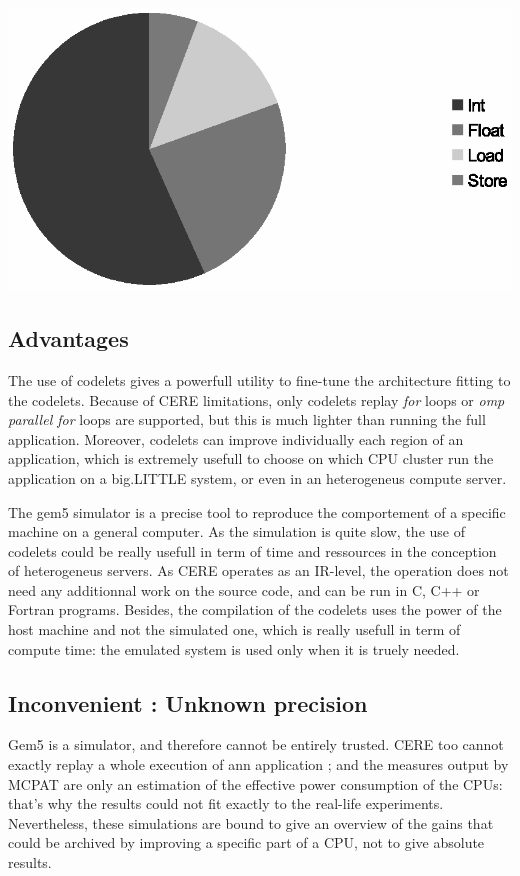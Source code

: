 \documentclass{article}
\newenvironment{Figure}
  {\par\medskip\noindent\center\minipage{0.9\linewidth}}
  {\endminipage\par\bigskip\medskip}
\begin{document}
\begin{multicols}{2}
\begin{Figure}
\centering
\includegraphics[width=\linewidth]{Blackscholes_instr.eps}
\end{Figure}

\subsection{Advantages}
The use of codelets gives a powerfull utility to fine-tune the architecture fitting to the codelets. Because of CERE limitations, only codelets replay \textit{for} loops or \textit{omp parallel for} loops are supported, but this is much lighter than running the full application. Moreover, codelets can improve individually each region of an application, which is extremely usefull to choose on which CPU cluster run the application on a big.LITTLE system, or even in an heterogeneus compute server.

The gem5 simulator is a precise tool to reproduce the comportement of a specific machine on a general computer. As the simulation is quite slow, the use of codelets could be really usefull in term of time and ressources in the conception of heterogeneus servers. As CERE operates as an IR-level, the operation does not need any additionnal work on the source code, and can be run in C, C++ or Fortran programs. Besides, the compilation of the codelets uses the power of the host machine and not the simulated one, which is really usefull in term of compute time: the emulated system is used only when it is truely needed.

\subsection{Inconvenient : Unknown precision}
Gem5 is a simulator, and therefore cannot be entirely trusted. CERE too cannot exactly replay a whole execution of ann application ; and the measures output by MCPAT are only an estimation of the effective power consumption of the CPUs: that's why the results could not fit exactly to the real-life experiments. Nevertheless, these simulations are bound to give an overview of the gains that could be archived by improving a specific part of a CPU, not to give absolute results.


\end{multicols}
\end{document}
